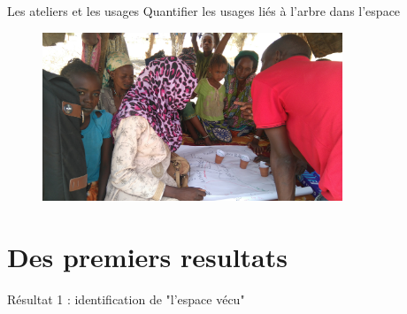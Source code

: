 \documentclass[newPxFont]{beamer}
\begin{document}

\begin{frame}[c]{Les ateliers et les usages}
\vspace{-1cm}
Quantifier les usages liés à l'arbre dans l'espace
\begin{figure}
  \centering
  \includegraphics[width = 0.8\textwidth]{img/DSC_1793}
\end{figure}

\end{frame}


\section{Des premiers resultats}

\begin{frame}[c]{Résultat 1 : identification de "l'espace vécu"}
\vspace{-1cm}
\begin{figure}
\end{figure}
\end{frame}
\end{document}
